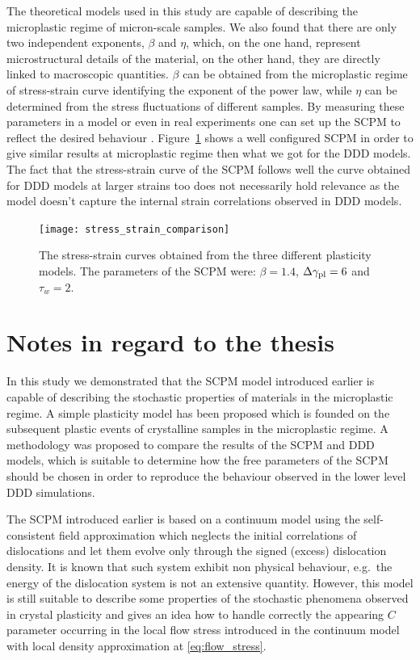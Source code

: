 The theoretical models used in this study are capable of describing the microplastic regime of micron-scale samples. We also found that there are only two independent exponents, $\beta$ and $\eta$, which, on the one hand, represent microstructural details of the material, on the other hand, they are directly linked to macroscopic quantities. $\beta$ can be obtained from the microplastic regime of stress-strain curve identifying the exponent of the power law, while $\eta$ can be determined from the stress fluctuations of different samples. By measuring these parameters in a model or even in real experiments one can set up the SCPM to reflect the desired behaviour . Figure~\ref{fig:stress_strain_comparison} shows a well configured SCPM in order to give similar results at microplastic regime then what we got for the DDD models. The fact that the stress-strain curve of the SCPM follows well the curve obtained for DDD models at larger strains too does not necessarily hold relevance as the model doesn't capture the internal strain correlations observed in DDD models.

\begin{figure}[htbp!] 
\centering    
\texttt{[image: stress\_strain\_comparison]}
\caption[Stress-strain curve comparison]{The stress-strain curves obtained from the three different plasticity models. The parameters of the SCPM were: $\beta  = 1.4$, $\Delta {\gamma _{{\rm{pl}}}} = 6$ and ${\tau _w} = 2$.}
\label{fig:stress_strain_comparison}
\end{figure}

\section*{Notes in regard to the thesis}
In this study we demonstrated that the SCPM model introduced earlier is capable of describing the stochastic properties of materials in the microplastic regime. A simple plasticity model has been proposed which is founded on the subsequent plastic events of crystalline samples in the microplastic regime. A methodology was proposed to compare the results of the SCPM and DDD models, which is suitable to determine how the free parameters of the SCPM should be chosen in order to reproduce the behaviour observed in the lower level DDD simulations.

The SCPM introduced earlier is based on a continuum model using the self-consistent field approximation which neglects the initial correlations of dislocations and let them evolve only through the signed (excess) dislocation density. It is known that such system exhibit non physical behaviour, e.g.\ the energy of the dislocation system is not an extensive quantity. However, this model is still suitable to describe some properties of the stochastic phenomena observed in crystal plasticity and gives an idea how to handle correctly the appearing $C$ parameter occurring in the local flow stress introduced in the continuum model with local density approximation at \cref{eq:flow_stress}.

